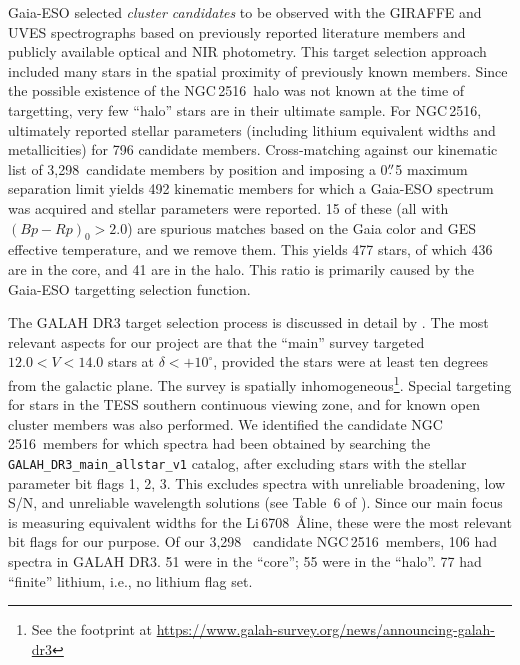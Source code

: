 \documentclass[12pt,twocolumn,tighten]{aastex63}
\newcommand{\cn}{NGC\,2516} %
\newcommand{\nkinematic}{3{,}298\ } %
\begin{document}
Gaia-ESO selected {\it cluster candidates} to be observed with the
GIRAFFE and UVES spectrographs based on previously reported literature
members and publicly available optical and NIR photometry.  This
target selection approach included many stars in the spatial proximity
of previously known members.  Since the possible existence of the \cn\ 
halo was not known at the time of targetting, very few ``halo'' stars
are in their ultimate sample.  For \cn, \citet{randich_gaiaeso_2018}
ultimately reported stellar parameters (including lithium equivalent
widths and metallicities) for 796 candidate members.  Cross-matching
against our kinematic list of \nkinematic candidate members by position and
imposing a 0$\mbox{$.\!\!^{\prime\prime}$}$5 maximum separation limit yields 492 kinematic
members for which a Gaia-ESO spectrum was acquired and stellar
parameters were reported.  15 of these (all with $(Bp-Rp)_0 > 2.0$)
are spurious matches based on the Gaia color and GES effective
temperature, and we remove them.  This yields 477 stars, of which 436
are in the core, and 41 are in the halo.  This ratio is primarily
caused by the Gaia-ESO targetting selection function.


The GALAH DR3 target selection process is discussed in detail by
\citet{buder_galah_2020}.  The most relevant aspects for our project
are that the ``main'' survey targeted $12.0<V<14.0$ stars at
$\delta<+10^\circ$, provided the stars were at least ten degrees from the
galactic plane.  The survey is spatially inhomogeneous\footnote{See
the footprint at
\url{https://www.galah-survey.org/news/announcing-galah-dr3}}. Special
targeting for stars in the TESS southern continuous viewing zone, and
for known open cluster members was also performed.  We identified the
candidate \cn\ members
for which spectra had been obtained by searching
the \texttt{GALAH\_DR3\_main\_allstar\_v1} catalog, after excluding
stars with the stellar parameter bit flags 1, 2, 3.  This excludes
spectra with unreliable broadening, low S/N, and unreliable wavelength
solutions (see Table~6 of \citealt{buder_galah_2020}).  Since our main
focus is measuring equivalent widths for the Li\,6708\ \AA line, these
were the most relevant bit flags for our purpose.  Of our \nkinematic
candidate \cn\ members, 106 had spectra in GALAH DR3.  51 were in the
``core''; 55 were in the ``halo''.
77 had ``finite'' lithium, i.e., no lithium flag set.
\end{document}
